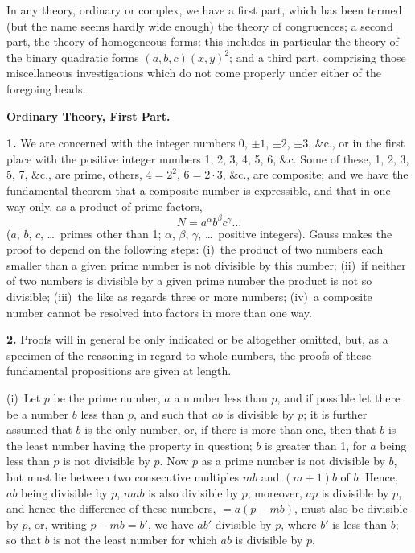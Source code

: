 \documentclass[11pt,a4paper]{book}
\begin{document}
In any theory, ordinary or complex, we have a first part, which has been termed (but the name seems hardly wide enough) the theory of congruences; a second part, the theory of homogeneous forms: this includes in particular the theory of the binary quadratic forms $(a, b, c)(x, y)^{2}$; and a third part, comprising those miscellaneous investigations which do not come properly under either of the foregoing heads.

\bigskip
\noindent\textbf{Ordinary Theory, First Part.}

\smallskip

\textbf{1.}\quad
We are concerned with the integer numbers $0$, $\pm 1$, $\pm 2$, $\pm 3$, \&c., or in the first place with the positive integer numbers 1, 2, 3, 4, 5, 6, \&c. Some of these, 1, 2, 3, 5, 7, \&c., are prime, others, $4 = 2^{2}$, $6 = 2 \cdot 3$, \&c., are composite; and we have the fundamental theorem that a composite number is expressible, and that in one way only, as a product of prime factors,
\[
N = a^{\alpha} b^{\beta} c^{\gamma} \ldots
\]
($a$, $b$, $c$, \ldots\ primes other than 1; $\alpha$, $\beta$, $\gamma$, \ldots\ positive integers). Gauss makes the proof to depend on the following steps: (i)~the product of two numbers each smaller than a given prime number is not divisible by this number; (ii)~if neither of two numbers is divisible by a given prime number the product is not so divisible; (iii)~the like as regards three or more numbers; (iv)~a composite number cannot be resolved into factors in more than one way.

\textbf{2.}\quad
Proofs will in general be only indicated or be altogether omitted, but, as a specimen of the reasoning in regard to whole numbers, the proofs of these fundamental propositions are given at length.

(i)~Let $p$ be the prime number, $a$ a number less than $p$, and if possible let there be a number $b$ less than $p$, and such that $ab$ is divisible by $p$; it is further assumed that $b$ is the only number, or, if there is more than one, then that $b$ is the least number having the property in question; $b$ is greater than 1, for $a$ being less than $p$ is not divisible by $p$. Now $p$ as a prime number is not divisible by $b$, but must lie between two consecutive multiples $mb$ and $(m + 1)b$ of $b$. Hence, $ab$ being divisible by $p$, $mab$ is also divisible by $p$; moreover, $ap$ is divisible by $p$, and hence the difference of these numbers, $= a(p - mb)$, must also be divisible by $p$, or, writing $p - mb = b'$, we have $ab'$ divisible by $p$, where $b'$ is less than $b$; so that $b$ is not the least number for which $ab$ is divisible by $p$.
\end{document}
